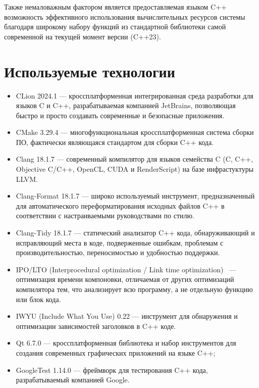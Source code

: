 Также немаловажным фактором является предоставляемая языком C++ возможность эффективного использования вычислительных ресурсов системы благодаря широкому набору функций из стандартной библиотеки самой современной на текущей момент версии (C++23).

\section{Используемые технологии}

\begin{itemize}
	\item CLion 2024.1 \cite{clion} — кроссплатформенная интегрированная среда разработки для языков C и C++, разрабатываемая компанией JetBrains, позволяющая быстро и просто создавать современные и безопасные приложения.
	\item CMake 3.29.4 \cite{cmake} — многофункциональная кроссплатформенная система сборки ПО, фактически являющаяся стандартом для сборки C++ кода.
	\item Clang 18.1.7 \cite{clang} — современный компилятор для языков семейства C (C, C++, Objective C/C++, OpenCL, CUDA и RenderScript) на базе инфрастуктуры LLVM.
	\item Clang-Format 18.1.7 \cite{clang-format} — широко используемый инструмент, предназначенный для автоматического переформатирования исходных файлов C++ в соответствии с настраиваемыми руководствами по стилю.
	\item Clang-Tidy 18.1.7 \cite{clang-tidy} — статический анализатор C++ кода, обнаруживающий и исправляющий места в коде, подверженные ошибкам, проблемам с производительностью, переносимостью и удобностью поддержки.
	\item IPO/LTO (Interprocedural optimization / Link time optimization) \cite{ipo-lto}~— оптимизация времени компоновки, отличаемая от других оптимизаций компилятора тем, что анализирует всю программу, а не отдельную функцию или блок кода.
	\item IWYU (Include What You Use) 0.22 \cite{iwyu} — инструмент для обнаружения и оптимизации зависимостей заголовков в C++ коде.
	\item Qt 6.7.0 \cite{qt} — кроссплатформенная библиотека и набор инструментов для создания современных графических приложений на языке C++;
	\item GoogleTest 1.14.0 \cite{googletest} — фреймворк для тестирования C++ кода, разрабатываемый компанией Google.
\end{itemize}

